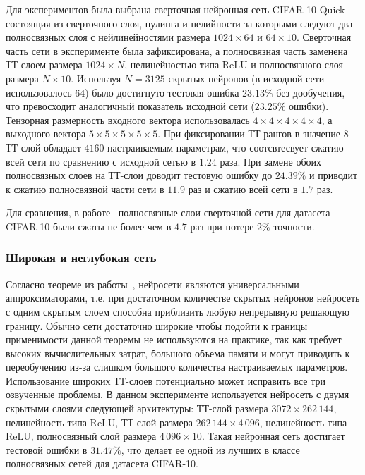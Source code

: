 Для экспериментов была выбрана сверточная нейронная сеть CIFAR-10 Quick~\cite{snoek2012cifarQuick} состоящия из сверточного слоя, пулинга и нелийности за которыми следуют два полносвязных слоя с нейлинейностями размера  $1024 \times 64$ и $64 \times 10$. Сверточная часть сети в эксперименте была зафиксирована, а полносвязная часть заменена ТТ-слоем размера $1024 \times N$, нелинейностью типа ReLU и полносвязного слоя размера $N \times 10$. Используя $N = 3125$ скрытых нейронов (в исходной сети использовалось $64$) было достигнуто тестовая ошибка $23.13\%$ без дообучения, что превосходит аналогичный показатель исходной сети ($23.25\%$ ошибки). Тензорная размерность входного вектора использовалась $4 \times 4 \times 4 \times 4 \times 4$, а выходного вектора $5 \times 5 \times 5 \times 5 \times 5$. При фиксировании ТТ-рангов в значение 8 ТТ-слой обладает $4160$ настраиваемым параметрам, что соотсвтесвует сжатию всей сети по сравнению с исходной сетью в $1.24$ раза. При замене обоих полносвязных слоев на ТТ-слои доводит тестовую ошибку до $24.39\%$ и приводит к сжатию полносвязной части сети в $11.9$ раз и сжатию всей сети в $1.7$ раз.

Для сравнения, в работе~\cite{Denil2013predicting} полносвязные слои сверточной сети для датасета CIFAR-10 были сжаты не более чем в $4.7$ раз при потере $2\%$ точности.

\subsubsection{Широкая и неглубокая сеть}
Согласно теореме из работы~\cite{cybenko1989universalApproximator}, нейросети являются универсальными аппроксиматорами, т.е. при достаточном количестве скрытых нейронов нейросеть с одним скрытым слоем способна приблизить любую непрерывную решающую границу. Обычно сети достаточно широкие чтобы подойти к границы применимости данной теоремы не используются на практике, так как требует высоких вычислительных затрат, большого объема памяти и могут приводить к переобучению из-за слишком большого количества настраиваемых параметров. Использование широких ТТ-слоев потенциально может исправить все три озвученные проблемы. В данном эксперименте используется нейросеть с двумя скрытыми слоями следующей архитектуры: ТТ-слой размера $3072 \times 262\,144$, нелинейность типа ReLU, ТТ-слой размера $262\,144 \times 4\,096$, нелинейность типа ReLU, полносвязный слой размера $4\,096 \times 10$. Такая нейронная сеть достигает тестовой ошибки в $31.47\%$, что делает ее одной из лучших в классе полносвязных сетей для датасета CIFAR-10.

